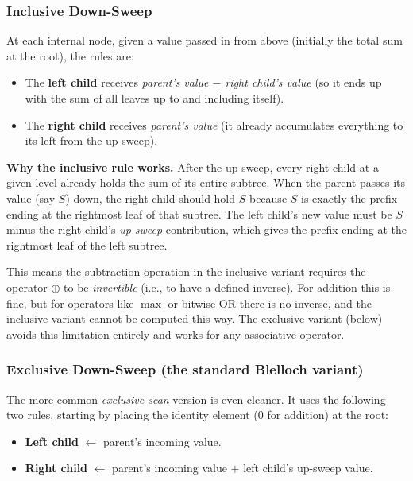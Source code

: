 \subsubsection{Inclusive Down-Sweep}
At each internal node, given a value passed in from above (initially the
total sum at the root), the rules are:
\begin{itemize}[leftmargin=*]
  \item The \textbf{left child} receives \emph{parent's value $-$ right child's value}
        (so it ends up with the sum of all leaves up to and including itself).
  \item The \textbf{right child} receives \emph{parent's value} (it already
        accumulates everything to its left from the up-sweep).
\end{itemize}

\begin{ppnote}
\textbf{Why the inclusive rule works.} After the up-sweep, every right
child at a given level already holds the sum of its entire subtree. When
the parent passes its value (say $S$) down, the right child should hold
$S$ because $S$ is exactly the prefix ending at the rightmost leaf of
that subtree. The left child's new value must be $S$ minus the right
child's \emph{up-sweep} contribution, which gives the prefix ending at
the rightmost leaf of the left subtree.

This means the subtraction operation in the inclusive variant requires
the operator $\oplus$ to be \emph{invertible} (i.e., to have a defined
inverse). For addition this is fine, but for operators like $\max$ or
bitwise-OR there is no inverse, and the inclusive variant cannot be
computed this way. The exclusive variant (below) avoids this limitation
entirely and works for any associative operator.
\end{ppnote}

\subsubsection{Exclusive Down-Sweep (the standard Blelloch variant)}
The more common \emph{exclusive scan} version is even cleaner. It uses the
following two rules, starting by placing the identity element ($0$ for
addition) at the root:
\begin{itemize}[leftmargin=*]
  \item \textbf{Left child} $\leftarrow$ parent's incoming value.
  \item \textbf{Right child} $\leftarrow$ parent's incoming value
        $+$ left child's up-sweep value.
\end{itemize}


